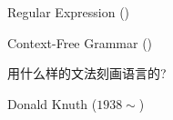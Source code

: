 





\begin{frame}{}
  \begin{center}
    Regular Expression ()

    \vspace{0.30cm}
    Context-Free Grammar ()


    \pause
    \vspace{0.20cm}
    {用什么样的文法刻画语言的?}

    \vspace{0.30cm}
  \end{center}
\end{frame}

\begin{frame}{}

  \begin{center}
    Donald Knuth ($1938 \sim$)

    \vspace{0.30cm}
  \end{center}
\end{frame}

